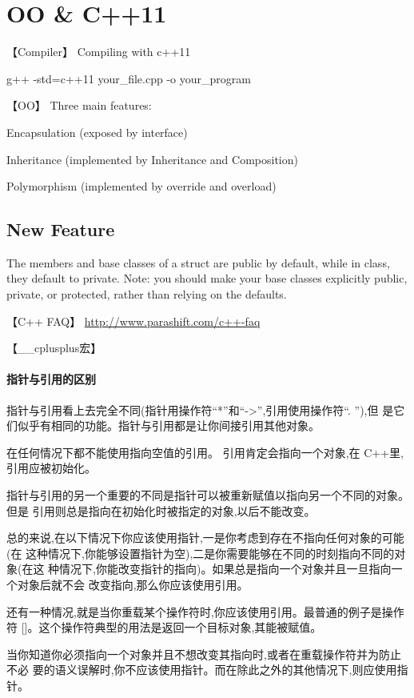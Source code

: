\chapter{OO \& C++11}
【Compiler】 Compiling with c++11

g++ -std=c++11 your_file.cpp -o your_program

【OO】 Three main features:
\begindot
\item Encapsulation (exposed by interface)
\item Inheritance (implemented by Inheritance and Composition)
\item Polymorphism (implemented by override and overload)
\myenddot

\section{New Feature}
The members and base classes of a struct are public by default, while in class, they default to private. Note: you should make your base classes explicitly public, private, or protected, rather than relying on the defaults.

【C++ FAQ】 \hyperref[C++ FAQ]{http://www.parashift.com/c++-faq}

【__cplusplus宏】

\subsubsection{指针与引用的区别}
指针与引用看上去完全不同(指针用操作符“*”和“->”,引用使用操作符“. ”),但 是它们似乎有相同的功能。指针与引用都是让你间接引用其他对象。

在任何情况下都不能使用指向空值的引用。 引用肯定会指向一个对象,在 C++里,引用应被初始化。

指针与引用的另一个重要的不同是指针可以被重新赋值以指向另一个不同的对象。但是 引用则总是指向在初始化时被指定的对象,以后不能改变。

总的来说,在以下情况下你应该使用指针,一是你考虑到存在不指向任何对象的可能(在 这种情况下,你能够设置指针为空),二是你需要能够在不同的时刻指向不同的对象(在这 种情况下,你能改变指针的指向)。如果总是指向一个对象并且一旦指向一个对象后就不会 改变指向,那么你应该使用引用。

还有一种情况,就是当你重载某个操作符时,你应该使用引用。最普通的例子是操作符 []。这个操作符典型的用法是返回一个目标对象,其能被赋值。

当你知道你必须指向一个对象并且不想改变其指向时,或者在重载操作符并为防止不必 要的语义误解时,你不应该使用指针。而在除此之外的其他情况下,则应使用指针。

